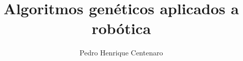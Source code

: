 \documentclass[a4paper, 12pt, bibliography=totoc]{scrartcl}
\title{Algoritmos genéticos aplicados a robótica}
\author{Pedro Henrique Centenaro}
\date{}
\begin{document}
\onehalfspacing
\maketitle

\newpage



\printbibliography
\end{document}
